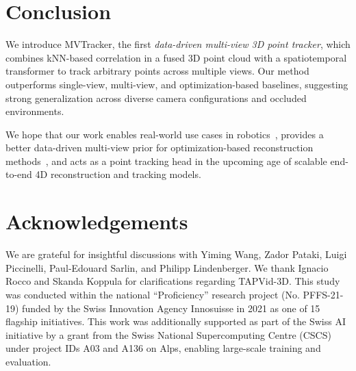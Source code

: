\documentclass[10pt,twocolumn,letterpaper]{article}
\begin{document}
\vfill
\section{Conclusion}
\label{sec:conclusion}
We introduce MVTracker, the first \emph{data-driven multi-view 3D point tracker}, which combines kNN-based correlation in a fused 3D point cloud with a spatiotemporal transformer to track arbitrary points across multiple views. Our method outperforms single-view, multi-view, and optimization-based baselines, suggesting strong generalization across diverse camera configurations and occluded environments.

We hope that our work enables real-world use cases in robotics~\cite{10611409}, provides a better data-driven multi-view prior for optimization-based reconstruction methods~\cite{som2024,lei2024mosca,luiten2023dynamic}, and acts as a point tracking head in the upcoming age of scalable end-to-end 4D reconstruction and tracking models.

\vfill
\section*{Acknowledgements}
\begin{fulljustify}
    We are grateful for insightful discussions with Yiming Wang, Zador Pataki, Luigi Piccinelli, Paul‑Edouard Sarlin, and Philipp Lindenberger. We thank Ignacio Rocco and Skanda Koppula for clarifications regarding TAPVid-3D. This study was conducted within the national “Proficiency” research project (No. PFFS-21-19) funded by the Swiss Innovation Agency Innosuisse in 2021 as one of 15 flagship initiatives. This work was additionally supported as part of the Swiss AI initiative by a grant from the Swiss National Supercomputing Centre (CSCS) under project IDs A03 and A136 on Alps, enabling large-scale training and evaluation.
\end{fulljustify}

\clearpage
{
    \small
    
    
}

\clearpage

\end{document}
